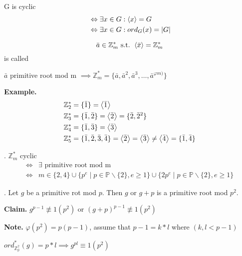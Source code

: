 G is cyclic
\begin{align*}
  & \Leftrightarrow \exists x \in G: \left\langle x \right\rangle = G \\
  & \Leftrightarrow \exists x \in G: ord_G(x) = |G|
\end{align*}

\begin{definition}
  \[
    \bar{a} \in \mathbb{Z}_m^{*} \text{ s.t. } \left\langle \bar{x} \right\rangle = \mathbb{Z}_m^{*} 
\]
is called 

$\bar{a}$ primitive root mod m 
$\implies \mathbb{Z}_m^{*} = \{\bar{a}, \bar{a}^2, \bar{a}^3, \ldots, \bar{a}^{\varphi{m)}} \}$
\end{definition}

\textbf{Example.}
\begin{align*}
  &\mathbb{Z}_2^{*} = \{\bar{1}\} = \left\langle \bar{1} \right\rangle \\
  &\mathbb{Z}_3^{*} = \{\bar{1}, \bar{2}\} = \left\langle \bar{2} \right\rangle 
    = \{\bar{2}, \bar{2}^2 \}\\
  &\mathbb{Z}_4^{*} = \{\bar{1}, \bar{3}\} = \left\langle \bar{3} \right\rangle \\
  &\mathbb{Z}_5^{*} = \{\bar{1}, \bar{2}, \bar{3}, \bar{4}\} 
    = \left\langle \bar{2} \right\rangle = \left\langle \bar{3} \right\rangle \neq \left\langle \bar{4} \right\rangle
    = \{\bar{1}, \bar{4}\} \\
\end{align*}


\Theorem.
$\mathbb{Z}_m^{*}$ cyclic  
\begin{align*}
  \Leftrightarrow 
    &\exists \text{ primitive root mod m} \\
  \Leftrightarrow 
    &m \in \{2,4\} \cup \{ p^e \mid p \in \mathbb{P} \backslash \{2\}, e \geq 1 \} \cup \{ 2p^e \mid p \in \mathbb{P} \backslash \{2\}, e \geq 1 \}
\end{align*}

\Proof.
Let $g$ be a primitive rot mod $p$. Then $g$ or $g+p$ is a primitive root mod $p^2$.


\textbf{Claim.}
$g^{p-1} \not\equiv 1 (p^2)$ or $(g+p)^{p-1} \not\equiv 1 (p^2)$

\textbf{Note.}
$\varphi(p^2) = p(p-1)$, assume that $p-1 = k*l$ where $(k, l < p-1)$

$ord_{\mathbb{Z_p^2}}^{*}(g) = p*l \implies g^{pl} \equiv 1 (p^2)$




